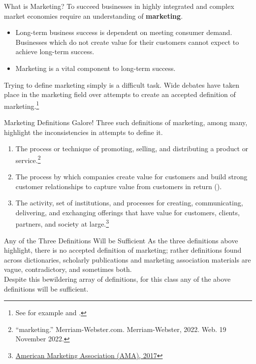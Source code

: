 \documentclass[pdf]{beamer}
\newcommand{\empr}[1]{{\color{franklinblue}\textbf{#1}}}
\theoremstyle{remark}
\theoremstyle{definition}
\begin{document}
\begin{frame}[t]{What is Marketing?}
To succeed businesses in highly integrated and complex market economies require an understanding of \empr{marketing}.  \\
\vspace{1.5ex}
\begin{itemize}
\item Long-term business success is dependent on meeting consumer demand. Businesses which do not create value for their customers cannot expect to achieve long-term success.  
\item Marketing is a vital component to long-term success. 
\end{itemize}
\normalsize
\vspace{0.0ex}
Trying to define marketing simply is a difficult task. Wide debates have taken place in the marketing field over attempts to create an accepted definition of marketing.\footnote{See for example \cite{sheth2007} and \cite{zinkhan2007}.} 
\vspace{1.5ex}
\end{frame}


\begin{frame}[t]{Marketing Definitions Galore!}
Three such definitions of marketing, among many, highlight the inconsistencies in attempts to define it. \\
  \vspace{1.5ex}
\begin{enumerate}
  \item The process or technique of promoting, selling, and distributing a product or service.\footnote{``marketing.'' Merriam-Webster.com. Merriam-Webster, 2022. Web. 19 November 2022.}
  \item The process by which companies create value for customers and build strong customer relationships to capture value from customers in return (\cite{kotler2012}).
  \item The activity, set of institutions, and processes for creating, communicating, delivering, and exchanging offerings that have value for customers, clients, partners, and society at large.\footnote{\href{https://www.ama.org/the-definition-of-marketing-what-is-marketing/}{American Marketing Association (AMA), 2017}}
\end{enumerate}
\end{frame}

\begin{frame}[t]{Any of the Three Definitions Will be Sufficient}
As the three definitions above highlight, there is no accepted definition of marketing; rather definitions found across dictionaries, scholarly publications and marketing association materials are vague, contradictory, and sometimes both. \\
\vspace{1.5ex}
Despite this bewildering array of definitions, for this class any of the above definitions will be sufficient.
\end{frame}
\end{document}
